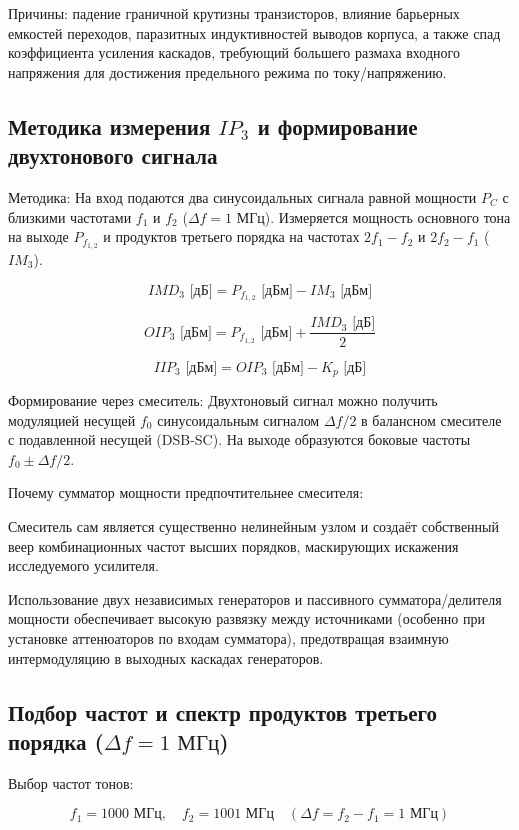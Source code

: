Причины: падение граничной крутизны транзисторов, влияние барьерных емкостей переходов, паразитных индуктивностей выводов корпуса, а также спад коэффициента усиления каскадов, требующий большего размаха входного напряжения для достижения предельного режима по току/напряжению.

\subsection {Методика измерения $IP_3$ и формирование двухтонового сигнала}

Методика: На вход подаются два синусоидальных сигнала равной мощности $P_C$ с близкими частотами $f_1$ и $f_2$ ($\Delta f = 1\text{ МГц}$). Измеряется мощность основного тона на выходе $P_{f_{1,2}}$ и продуктов третьего порядка на частотах $2f_1 - f_2$ и $2f_2 - f_1$ ($IM_3$).


$$IMD_3\text{ [дБ]} = P_{f_{1,2}}\text{ [дБм]} - IM_3\text{ [дБм]}$$

$$OIP_3\text{ [дБм]} = P_{f_{1,2}}\text{ [дБм]} + \frac{IMD_3\text{ [дБ]}}{2}$$

$$IIP_3\text{ [дБм]} = OIP_3\text{ [дБм]} - K_p\text{ [дБ]}$$

Формирование через смеситель: Двухтоновый сигнал можно получить модуляцией несущей $f_0$ синусоидальным сигналом $\Delta f / 2$ в балансном смесителе с подавленной несущей (DSB-SC). На выходе образуются боковые частоты $f_0 \pm \Delta f / 2$.

Почему сумматор мощности предпочтительнее смесителя:

Смеситель сам является существенно нелинейным узлом и создаёт собственный веер комбинационных частот высших порядков, маскирующих искажения исследуемого усилителя.

Использование двух независимых генераторов и пассивного сумматора/делителя мощности обеспечивает высокую развязку между источниками (особенно при установке аттенюаторов по входам сумматора), предотвращая взаимную интермодуляцию в выходных каскадах генераторов.

\subsection {Подбор частот и спектр продуктов третьего порядка ($\Delta f = 1\text{ МГц}$)}

Выбор частот тонов:

$$f_1 = 1000\text{ МГц},\quad f_2 = 1001\text{ МГц}\quad (\Delta f = f_2 - f_1 = 1\text{ МГц})$$

